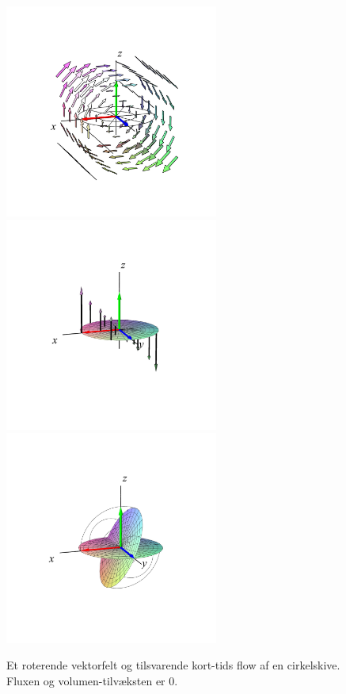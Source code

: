 \begin{figure}[ht]
\centerline{\includegraphics[width=70mm]{FIGS/plotSkiveFlowRot1}\includegraphics[width=70mm]{FIGS/plotSkiveFlowRot3}\includegraphics[width=70mm]{FIGS/plotSkiveFlowRot2}}
\begin{center}
\caption{\small{Et roterende vektorfelt og tilsvarende kort-tids flow af en cirkelskive. Fluxen og volumen-tilvæksten er $0$. }} \label{figSkiveFlowRot}
\end{center}
\end{figure}










